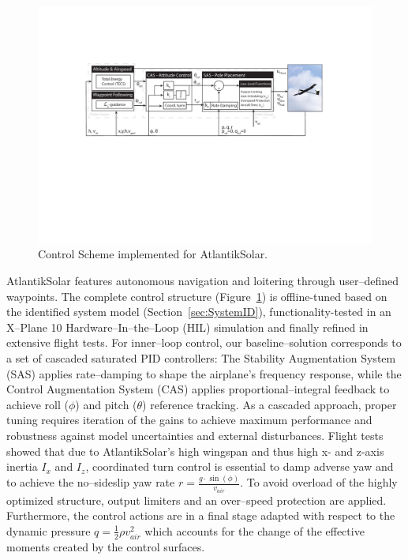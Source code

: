 
\begin{figure}[tb]
    \centering
     \includegraphics[width=\linewidth]{images/11_ControlScheme/ControlScheme.pdf}
    \caption{Control Scheme implemented for AtlantikSolar.}
    \label{fig:ControlScheme}
\end{figure}

AtlantikSolar features autonomous navigation and loitering through user--defined waypoints. The complete control structure (Figure~\ref{fig:ControlScheme}) is offline-tuned based on the identified system model (Section~\ref{sec:SystemID}), functionality-tested in an X--Plane 10 Hardware--In--the--Loop (HIL) simulation and finally refined in extensive flight tests. For inner--loop control, our baseline--solution corresponds to a set of cascaded saturated PID controllers: The Stability Augmentation System (SAS) applies rate--damping to shape the airplane's frequency response, while the Control Augmentation System (CAS) applies proportional--integral feedback to achieve roll ($\phi$) and pitch ($\theta$) reference tracking. As a cascaded approach, proper tuning requires iteration of the gains to achieve maximum performance and robustness against model uncertainties and external disturbances. Flight tests showed that due to AtlantikSolar's high wingspan and thus high x- and z-axis inertia $I_x$ and $I_z$, coordinated turn control is essential to damp adverse yaw and to achieve the no--sideslip yaw rate $r=\frac{g\cdot \sin(\phi)}{v_{air}}$. To avoid overload of the highly optimized structure, output limiters and an over--speed protection are applied. Furthermore, the control actions are in a final stage adapted with respect to the dynamic pressure $q=\frac{1}{2}\rho v^{2}_{air}$ which accounts for the change of the effective moments created by the control surfaces. 

